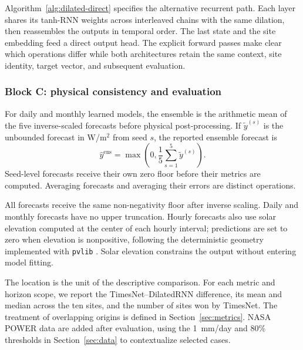 Algorithm~\ref{alg:dilated-direct} specifies the alternative recurrent path.
Each layer shares its tanh-RNN weights across interleaved chains with the same
dilation, then reassembles the outputs in temporal order. The last state
and the site embedding feed a direct output head. The explicit forward
passes make clear which operations differ while both architectures retain
the same context, site identity, target vector, and subsequent evaluation.



\subsubsection{Block C: physical consistency and evaluation}

For daily and monthly learned models, the ensemble is the arithmetic mean
of the five inverse-scaled forecasts before physical post-processing.
If $\widetilde{y}^{(s)}$ is the unbounded forecast in W/m$^2$ from seed $s$,
the reported ensemble forecast is
\begin{equation}
 \widehat{y}^{\mathrm{ens}}
 =
 \max\!\left(0,\frac{1}{5}\sum_{s=1}^{5}\widetilde{y}^{(s)}\right).
 \label{eq:ensemble_forecast}
\end{equation}
Seed-level forecasts receive their own zero floor before their metrics are
computed. Averaging forecasts and averaging their errors are distinct
operations.

All forecasts receive the same non-negativity floor after inverse scaling.
Daily and monthly forecasts have no upper truncation. Hourly forecasts also use
solar elevation computed at the center of each hourly interval; predictions
are set to zero when elevation is nonpositive, following the deterministic
geometry implemented with \texttt{pvlib} \cite{anderson2023}. Solar elevation constrains
the output without entering model fitting.

The location is the unit of the descriptive comparison. For each metric
and horizon scope, we report the TimesNet--DilatedRNN difference, its mean
and median across the ten sites, and the number of sites won by TimesNet.
The treatment of overlapping origins is defined in Section~\ref{sec:metrics}.
NASA POWER data are added after evaluation, using the 1~mm/day and 80\%
thresholds in Section~\ref{sec:data} to contextualize selected cases.
